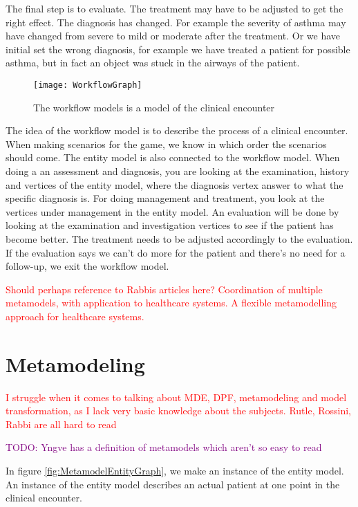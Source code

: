 The final step is to evaluate. The treatment may have to be adjusted to get the right effect. The diagnosis has changed. For example the severity of asthma may have changed from severe to mild or moderate after the treatment. Or we have initial set the wrong diagnosis, for example we have treated a patient for possible asthma, but in fact an object was stuck in the airways of the patient.


\begin{figure}[h!]
	\texttt{[image: WorkflowGraph]}
	\caption {The workflow models is a model of the clinical encounter}
		\label{fig:WorkflowGraph}
\end{figure}

The idea of the workflow model is to describe the process of a clinical encounter. When making scenarios for the game, we know in which order the scenarios should come. The entity model is also connected to the workflow model. When doing a an assessment and diagnosis, you are looking at the examination, history and vertices of the entity model, where the diagnosis vertex answer to what the specific diagnosis is. For doing management and treatment, you look at the vertices under management in the entity model. An evaluation will be done by looking at the examination and investigation vertices to see if the patient has become better. The treatment needs to be adjusted accordingly to the evaluation. If the evaluation says we can't do more for the patient and there's no need for a follow-up, we exit the workflow model.

\textcolor{red}{Should perhaps reference to Rabbis articles here? 
	Coordination	of multiple metamodels, with application	to healthcare systems.
A flexible metamodelling approach for healthcare systems. }

\section{Metamodeling}

\textcolor{red}{I struggle when it comes to talking about MDE, DPF, metamodeling and model transformation, as I lack very basic knowledge about the subjects. Rutle, Rossini, Rabbi are all hard to read}

\textcolor{purple}{TODO: Yngve has a definition of metamodels which aren't so easy to read}

In figure \ref{fig:MetamodelEntityGraph}, we make an instance of the entity model. An instance of the entity model describes an actual patient at one point in the clinical encounter. 

